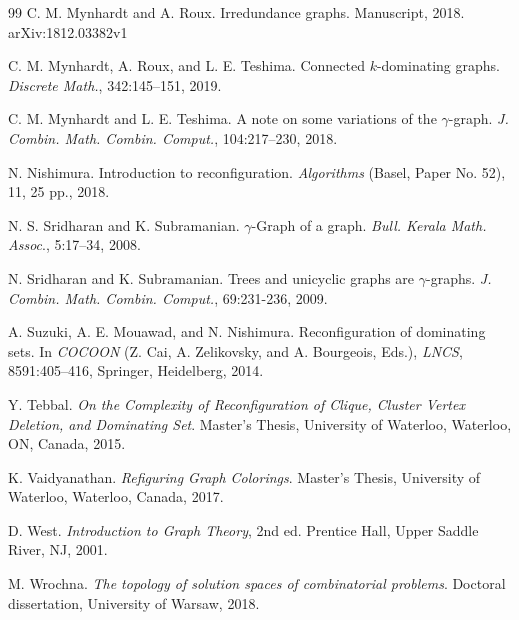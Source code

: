 \documentclass[12pt]{article}%
\begin{document}
\begin{thebibliography}{99}
C. M. Mynhardt and A. Roux. Irredundance graphs. Manuscript,
2018. arXiv:1812.03382v1

C. M. Mynhardt, A. Roux, and L. E. Teshima. Connected
$k$-dominating graphs. \emph{Discrete Math.}, 342:145--151, 2019.

C. M. Mynhardt and L. E. Teshima. A note on some variations
of the $\gamma$-graph. \emph{J. Combin. Math. Combin. Comput.}, 104:217--230, 2018.

N. Nishimura. Introduction to reconfiguration.
\emph{Algorithms} (Basel, Paper No. 52), 11, 25 pp., 2018.

N. S. Sridharan and K. Subramanian. $\gamma$-Graph of a
graph. \emph{Bull. Kerala Math. Assoc}., 5:17--34, 2008.

N. Sridharan and K. Subramanian. Trees and unicyclic
graphs are $\gamma$-graphs. \emph{J. Combin. Math. Combin. Comput.},
69:231-236, 2009.

A. Suzuki, A. E. Mouawad, and N. Nishimura. Reconfiguration
of dominating sets. In \emph{COCOON} (Z. Cai, A. Zelikovsky, and A. Bourgeois,
Eds.), \emph{LNCS}, 8591:405--416, Springer, Heidelberg, 2014.

Y. Tebbal. \emph{On the Complexity of Reconfiguration of
Clique, Cluster Vertex Deletion, and Dominating Set}. Master's Thesis,
University of Waterloo, Waterloo, ON, Canada, 2015.

K. Vaidyanathan. \emph{Refiguring Graph Colorings}.
Master's Thesis, University of Waterloo, Waterloo, Canada, 2017.

D. West. \emph{Introduction to Graph Theory}, 2nd ed.
Prentice Hall, Upper Saddle River, NJ, 2001.

M. Wrochna. \emph{The topology of solution spaces
of combinatorial problems}. Doctoral dissertation, University of Warsaw, 2018.
\end{thebibliography}
\end{document}
